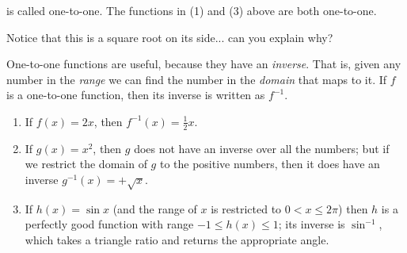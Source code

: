 \begin{ex}
\begin{enumerate}
          is called one-to-one. The functions in (1) and (3) above are both one-to-one.
          \begin{center}
          \end{center}
          Notice that this is a square root on its side... can you explain why?
  \end{enumerate}
\end{ex}

One-to-one functions are useful, because they have an \emph{inverse}. That is, given any number in the \emph{range} we can find
the number in the \emph{domain} that maps to it. If $ f $ is a one-to-one function, then its inverse is written as $ f^{-1} $.

\begin{ex}\leavevmode
  \begin{enumerate}
    \item If $ f(x) = 2x $, then $ f^{-1}(x) = \frac{1}{2} x $.
    \item If $ g(x) = x^2 $, then $ g $ does not have an inverse over all the numbers; but if we restrict the domain of $ g $ to
          the positive numbers, then it does have an inverse $ g^{-1}(x) = +\sqrt{x} $.
    \item If $ h(x) = \sin x $ (and the range of $ x $ is restricted to $ 0 < x \leq 2\pi $) then $ h $ is a perfectly good function
          with range $ -1 \leq h(x) \leq 1 $; its inverse is $ \sin^{-1} $, which takes a triangle ratio and returns the appropriate angle.
  \end{enumerate}
\end{ex}

\clearpage
